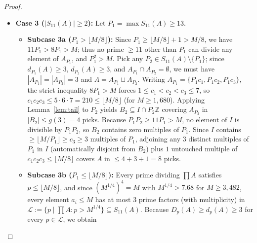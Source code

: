 \documentclass[11pt]{article}
\begin{document}
\begin{proof}
\begin{enumerate}
\begin{itemize}
\begin{itemize}
\item $d = 5$ ($g(5) = 6$, tail $[\lfloor M / 7 \rfloor, \lfloor M / 8 \rfloor]$): for every $M \ge 3{,}137$ and prime $q \le \sqrt{M}$, $q(\lfloor M / (7q) \rfloor + 1)(\lfloor M / (8q) \rfloor + 1) > M^2 / (56q) \ge M^{3/2} / 56 > M \ge x_1$.
\item $d = 4$ ($g(4) = 5$, tail $[\lfloor M / 6 \rfloor, \lfloor M / 7 \rfloor, \lfloor M / 8 \rfloor]$): Lemma~\ref{lem:ffd} closes all $M \ge 16{,}465$ ($T(2), T(3), T(5) > M^2$, $T(7) > M^2 / 2$), and every $\{2, 3, 5, 7\}$-smooth pair $(x_1, x_2)$ on $[3482, 16464]$ is verified at the monotone lower endpoint $M_{\min} = \max(3482, x_2)$~\cite{bergstrom26smallcode}.
\item $d = 3$ ($g(3) = 4$, tail $[\lfloor M / 5 \rfloor, \dots, \lfloor M / 8 \rfloor]$): Lemma~\ref{lem:ffd} closes all $M \ge 576{,}241$, and every divisor-closed $\{2, 3, 5, 7\}$-smooth triple $(x_1, x_2, x_3)$ up to $576{,}240$ is verified at $M_{\min} = \max(3482, x_3)$~\cite{bergstrom26smallcode}.
\end{itemize}
\item \textbf{Case 3 ($|S_{11}(A)| \ge 2$):} Let $P_1 = \max S_{11}(A) \ge 13$.
\begin{itemize}
\item \textbf{Subcase 3a ($P_1 > \lfloor M / 8 \rfloor$):} Since $P_1 \ge \lfloor M / 8 \rfloor + 1 > M / 8$, we have $11 P_1 > 8 P_1 > M$; thus no prime $\ge 11$ other than $P_1$ can divide any element of $A_{P_1}$, and $P_1^2 > M$. Pick any $P_2 \in S_{11}(A) \setminus \{P_1\}$; since $d_{P_1}(A) \ge 3$, $d_{P_2}(A) \ge 3$, and $A_{P_1} \cap A_{P_2} = \emptyset$, we must have $|A_{P_1}| = |A_{P_2}| = 3$ and $A = A_{P_1} \sqcup A_{P_2}$. Writing $A_{P_1} = \{P_1 c_1, P_1 c_2, P_1 c_3\}$, the strict inequality $8 P_1 > M$ forces $1 \le c_1 < c_2 < c_3 \le 7$, so $c_1 c_2 c_3 \le 5 \cdot 6 \cdot 7 = 210 \le \lfloor M / 8 \rfloor$ (for $M \ge 1{,}680$). Applying Lemma~\ref{lem:tail} to $P_2$ yields $B_2 \subseteq I \cap P_2 \mathbb{Z}$ covering $A_{P_2}$ in $|B_2| \le g(3) = 4$ picks. Because $P_1 P_2 \ge 11 P_1 > M$, no element of $I$ is divisible by $P_1 P_2$, so $B_2$ contains zero multiples of $P_1$. Since $I$ contains $\ge \lfloor M / P_1 \rfloor \ge c_3 \ge 3$ multiples of $P_1$, adjoining any $3$ distinct multiples of $P_1$ in $I$ (automatically disjoint from $B_2$) plus $1$ untouched multiple of $c_1 c_2 c_3 \le \lfloor M / 8 \rfloor$ covers $A$ in $\le 4 + 3 + 1 = 8$ picks.
\item \textbf{Subcase 3b ($P_1 \le \lfloor M / 8 \rfloor$):} Every prime dividing $\prod A$ satisfies $p \le \lfloor M / 8 \rfloor$, and since $(M^{1/4})^4 = M$ with $M^{1/4} > 7.68$ for $M \ge 3{,}482$, every element $a_i \le M$ has at most $3$ prime factors (with multiplicity) in $\mathcal{L} := \{p \mid \prod A : p > M^{1/4}\} \subseteq S_{11}(A)$. Because $D_p(A) \ge d_p(A) \ge 3$ for every $p \in \mathcal{L}$, we obtain

\end{itemize}
\end{itemize}
\end{enumerate}
\end{proof}
\end{document}
